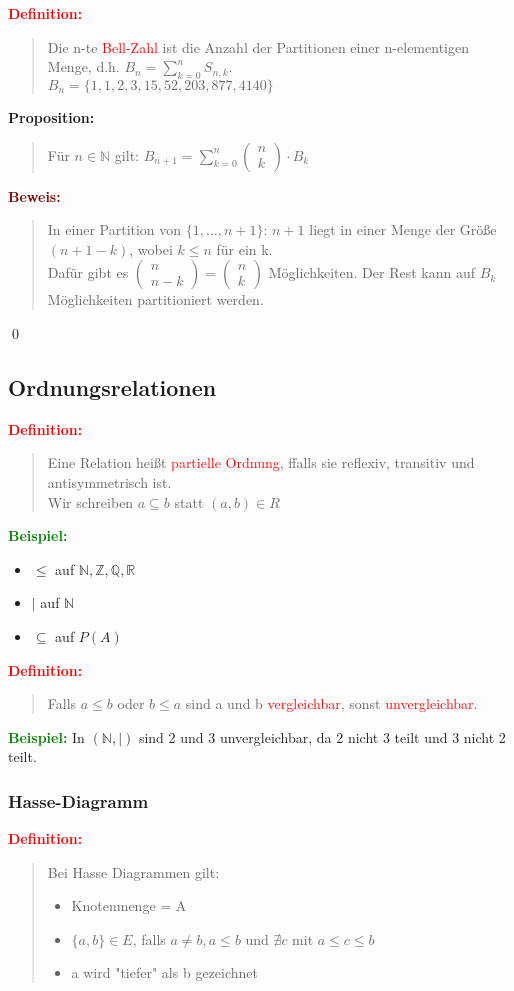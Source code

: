\documentclass{article}
\newcommand{\red}[1]{\textcolor{red}{#1}}
\newcommand{\green}[1]{\textcolor{green}{#1}}
\newcommand{\dgr}[1]{\textcolor{dgr}{#1}}
\newcommand{\maroon}[1]{\textcolor{maroon}{#1}}
\newcommand{\ex}{\green{\textbf{Beispiel: }}}
\newcommand{\de}[1]{\red{\textbf{Definition: }}\begin{quote}#1\end{quote}}
\newcommand{\prop}[1]{\dgr{\textbf{Proposition: }}\begin{quote}#1\end{quote}}
\newcommand{\pr}[1]{\maroon{\textbf{Beweis: }}\begin{quote}#1\end{quote}\qed}
\newcommand{\N}{\mathbb{N}}
\newcommand{\Z}{\mathbb{Z}}
\newcommand{\Q}{\mathbb{Q}}
\newcommand{\R}{\mathbb{R}}
\newcommand{\vvec}[2]{\begin{pmatrix}#1\\#2\end{pmatrix}}
\begin{document}
\newpage
\de{
    Die n-te \red{Bell-Zahl} ist die Anzahl der Partitionen einer n-elementigen Menge, d.h. $B_n = \sum_{k=0}^{n} S_{n,k}$.\\
    $B_n = \{1,1,2,3,15,52,203,877,4140\}$
}

\prop{
    Für $n\in \N$ gilt: $B_{n+1} = \sum_{k = 0}^{n} \vvec{n}{k} \cdot B_k$
}

\pr{
    In einer Partition von $\{1, \dots, n+1\}$: $n+1$ liegt in einer Menge der Größe $(n+1-k)$, wobei $k \le n$ für ein k.\\
    Dafür gibt es $\vvec{n}{n-k} = \vvec{n}{k}$ Möglichkeiten. Der Rest kann auf $B_k$ Möglichkeiten partitioniert werden.
}

\subsection{Ordnungsrelationen}

\de{
    Eine Relation heißt \red{partielle Ordnung}, ffalls sie reflexiv, transitiv und antisymmetrisch ist.\\
    Wir schreiben $a \subseteq b$ statt $(a,b) \in R$
}

\ex \begin{itemize}
    \item $\le$ auf $\N, \Z, \Q, \R$
    \item $|$ auf $\N$
    \item $\subseteq$ auf $P(A)$
\end{itemize}

\de{
    Falls $a \le b$ oder $b \le a$ sind a und b \red{vergleichbar}, sonst \red{unvergleichbar}.
}

\ex In $(\N, |)$ sind 2 und 3 unvergleichbar, da 2 nicht 3 teilt und 3 nicht 2 teilt.

\subsubsection{Hasse-Diagramm}

\de{
    Bei Hasse Diagrammen gilt:
    \begin{itemize}
        \item Knotenmenge = A
        \item $\{a,b\} \in E$, falls $a \ne b, a \le b$ und $\nexists c$ mit $a \le c \le b$
        \item a wird "tiefer" als b gezeichnet
    \end{itemize}
}
\end{document}

